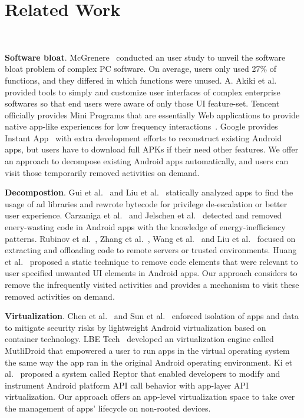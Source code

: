 \section{Related Work}\
\label{sec:related_work}

\textbf{Software bloat}. McGrenere~\cite{McGrenereCHI2000} conducted an user study to unveil the software bloat problem of complex PC software. On average, users only used 27\% of functions, and they differed in which functions were unused. A. Akiki et al.~\cite{Akiki13aEICS}\cite{Akiki13bEICS} provided tools to simply and customize user interfaces of complex enterprise softwares so that end users were aware of only those UI feature-set. Tencent officially provides Mini Programs that are essentially Web applications to provide native app-like experiences for low frequency interactions~\cite{miniprogram}. Google provides Instant App~\cite{instantapp} with extra development efforts to reconstruct existing Android apps, but users have to download full APKs if their need other features. We offer an approach to decompose existing Android apps automatically, and users can visit those temporarily removed activities on demand.


\textbf{Decompostion}. Gui et al.~\cite{ICSE15Gui} and Liu et al.~\cite{mobisys2015Liu} statically analyzed apps to find the usage of ad libraries and rewrote bytecode for privilege de-escalation or better user experience. Carzaniga et al.~\cite{Carzaniga14ICSE} and Jelschen et al.~\cite{Jelschen12CSMR} detected and removed enery-wasting code in Android apps with the knowledge of energy-inefficiency patterns. Rubinov et al.~\cite{ICSE2016Rubinov}, Zhang et al.~\cite{OOPSLA2012Zhang}\cite{FCS12Zhang}, Wang et al.~\cite{Splash12Wang} and Liu et al.~\cite{TOIT17Liu} focused on extracting and offloading code to remote servers or trusted environments. Huang et al.~\cite{huangASE2017} proposed a static technique to remove code elements that were relevant to user specified unwanted UI elements in Android apps. Our approach considers to remove the infrequently visited activities and provides a mechanism to visit these removed activities on demand.


\textbf{Virtualization}. Chen et al.~\cite{Chen15TC} and Sun et al.~\cite{Sun2013ICCT} enforced isolation of apps and data to mitigate security risks by lightweight Android virtualization based on container technology. LBE Tech~\cite{multidroid} developed an virtualization engine called MutliDroid that empowered a user to run apps in the virtual operating system the same way the app ran in the original Android operating environment. Ki et al.~\cite{Mobisys17Ki} proposed a system called Reptor that enabled developers to modify and instrument Android platform API call behavior with app-layer API virtualization. Our approach offers an app-level virtualization space to take over the management of apps' lifecycle on non-rooted devices.

